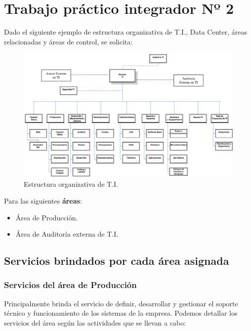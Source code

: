 \section{Trabajo práctico integrador Nº 2}

Dado el siguiente ejemplo de estructura organizativa de T.I., Data Center, áreas relacionadas y áreas de control, se solicita:

\begin{figure}[h]
  \centering
  \includegraphics[width=.85\textwidth]{img/tp2_integrador/organigrama}
  \caption{Estructura organizativa de T.I.}
  \label{organigrama-enunciado}
\end{figure}

Para las siguientes \textbf{áreas}:

\begin{itemize}
    \item Área de Producción.
    \item Área de Auditoría externa de T.I.
\end{itemize}


\newpage

	\subsection{Servicios brindados por cada área asignada}
    
    \subsubsection{Servicios del área de Producción}
    
    Principalmente brinda el servicio de definir, desarrollar y gestionar el soporte técnico y funcionamiento de los sistemas de la empresa. 
    Podemos detallar los servicios del área según las actividades que se llevan a cabo:
    
